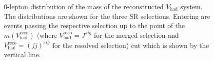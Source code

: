 \begin{figure}[ht]
    \centering
    \caption{0-lepton distribution of the mass of the reconstructed $V_\text{had}$ system. The distributions are shown for the three SR selections. Entering are events passing the respective selection up to the point of the $m(V_\text{had}^\text{reco})$ (where $V_\text{had}^\text{reco}=J^{sig}$ for the merged selection and $V_\text{had}^\text{reco}=(jj)^{sig}$ for the resolved selection) cut which is shown by the vertical line.} 
    \label{fig:0lepMVHad}
\end{figure}

